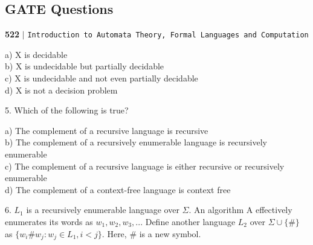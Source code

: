 \documentclass[8pt]{beamer}
\begin{document}
\begin{frame}
\section*{GATE Questions}
\begin{flushleft}
    \textbf{522}\hspace*{0.1cm} \textbf{$|$} \hspace*{0.1cm} \texttt{Introduction to Automata Theory, Formal Languages and Computation}
  \end{flushleft}
  \vspace*{0.5cm}
  
\hspace*{0.5cm} a) X is decidable\\
\hspace*{0.5cm} b) X is undecidable but partially decidable\\
\hspace*{0.5cm} c) X is undecidable and not even partially decidable\\
\hspace*{0.5cm} d) X is not a decision problem\\
\vspace*{0.2cm}

\hspace*{-0.4cm} 
5. Which of the following is true?\\
\vspace*{0.1cm}

\hspace*{0.5cm} a) The complement of a recursive language is recursive\\
\hspace*{0.5cm} b) The complement of a recursively enumerable language is recursively enumerable\\
\hspace*{0.5cm} c) The complement of a recursive language is either recursive or recursively enumerable\\
\hspace*{0.5cm} d) The complement of a context-free language is context free\\
\vspace*{0.2cm}

\hspace*{-0.4cm}
6. $L _{1}$ is a recursively enumerable language over $\Sigma$. An algorithm A effectively enumerates its words
as $w _{1}, w _{2}, w _{3}, . . .$ Define another language $L _{2}$ over $\Sigma \cup \{\#\}$ as $\{w _{i} \# w _{j}: w _{j} \in L _{1}, i < j\}$. Here, $\#$ is a new symbol.\\

\vspace*{0.1cm}
\end{frame}
\end{document}

